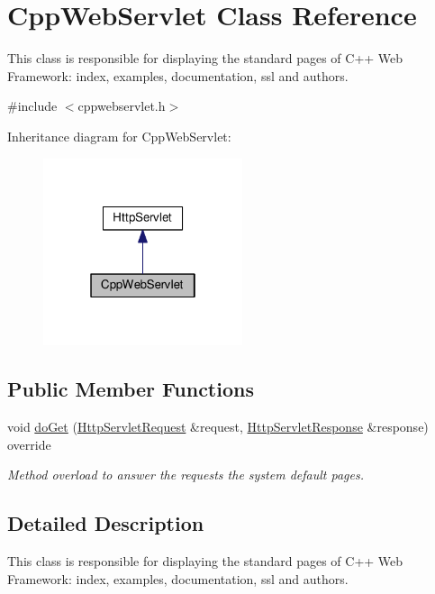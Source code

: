 \hypertarget{class_cpp_web_servlet}{}\section{Cpp\+Web\+Servlet Class Reference}
\label{class_cpp_web_servlet}


This class is responsible for displaying the standard pages of C++ Web Framework\+: index, examples, documentation, ssl and authors.  




{\ttfamily \#include $<$cppwebservlet.\+h$>$}



Inheritance diagram for Cpp\+Web\+Servlet\+:\nopagebreak
\begin{figure}[H]
\begin{center}
\leavevmode
\includegraphics[width=166pt]{class_cpp_web_servlet__inherit__graph}
\end{center}
\end{figure}
\subsection*{Public Member Functions}
\begin{DoxyCompactItemize}
\item 
void \hyperlink{class_cpp_web_servlet_a8d32d5ba8ba73c10a7c1abc81497d898}{do\+Get} (\hyperlink{class_http_servlet_request}{Http\+Servlet\+Request} \&request, \hyperlink{class_http_servlet_response}{Http\+Servlet\+Response} \&response) override
\begin{DoxyCompactList}\small\item\em Method overload to answer the requests the system default pages. \end{DoxyCompactList}\end{DoxyCompactItemize}


\subsection{Detailed Description}
This class is responsible for displaying the standard pages of C++ Web Framework\+: index, examples, documentation, ssl and authors. 

